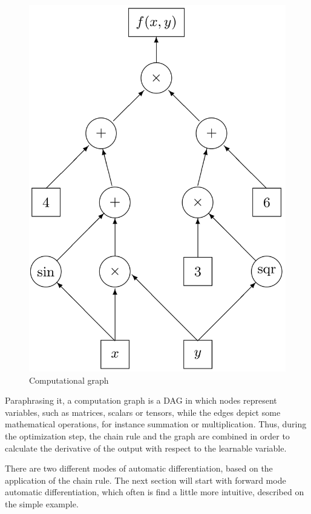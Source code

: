 \documentclass{pracamgr}
\numberwithin{equation}{section}
\begin{document}
\begin{figure}[H] \centering
\includegraphics[scale=0.3]{Computational_graph}
\caption[Computational graph]{Computational graph\footnotemark}
\label{Computational_graph}
\end{figure} 


Paraphrasing it, a computation graph is a DAG in which nodes represent variables, such as matrices, scalars or tensors, while the edges depict some mathematical operations, for instance summation or multiplication. Thus, during the optimization step, the chain rule and the graph are combined in order to calculate the derivative of the output with respect to the learnable variable.

There are two different modes of automatic differentiation, based on the application of the chain rule. The next section will start with forward mode automatic differentiation, which often is find a little more intuitive, described on the simple example.
\end{document}

